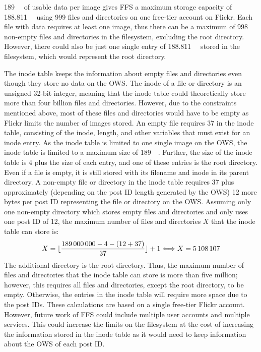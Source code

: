 \SI{189}{\mega\byte} of usable data per image gives \gls{FFS} a maximum storage capacity of \SI{188.811}{\giga\byte} using 999 files and directories on one \mbox{free-tier} account on Flickr. Each file with data requires at least one image, thus there can be a maximum of 998 \mbox{non-empty} files and directories in the filesystem, excluding the root directory. However, there could also be just one single entry of \SI{188.811}{\giga\byte} stored in the filesystem, which would represent the root directory.

The inode table keeps the information about empty files and directories even though they store no data on the \gls{OWS}. The inode of a file or directory is an unsigned \mbox{32-bit} integer, meaning that the inode table could theoretically store more than four billion files and directories. However, due to the constraints mentioned above, most of these files and directories would have to be empty as Flickr limits the number of images stored. An empty file requires \SI{37}{\byte} in the inode table, consisting of the inode, length, and other variables that must exist for an inode entry. As the inode table is limited to one single image on the \gls{OWS}, the inode table is limited to a maximum size of \SI{189}{\mega\byte}. Further, the size of the inode table is \SI{4}{\byte} plus the size of each entry, and one of these entries is the root directory. Even if a file is empty, it is still stored with its filename and inode in its parent directory. A \mbox{non-empty} file or directory in the inode table requires \SI{37}{\byte} plus approximately (depending on the post ID length generated by the \gls{OWS}) 12 more bytes per post ID representing the file or directory on the \gls{OWS}. Assuming only one \mbox{non-empty} directory which stores empty files and directories and only uses one post ID of \SI{12}{\byte}, the maximum number of files and directories $X$ that the inode table can store is:
$$
	X = \lfloor \frac{189\,000\,000 - 4 - (12 + 37)}{37} \rfloor + 1 \Longleftrightarrow X = 5\,108\,107
$$
The additional directory is the root directory. Thus, the maximum number of files and directories that the inode table can store is more than five million; however, this requires all files and directories, except the root directory, to be empty. Otherwise, the entries in the inode table will require more space due to the post IDs. These calculations are based on a single \mbox{free-tier} Flickr account. However, future work of \gls{FFS} could include multiple user accounts and multiple services. This could increase the limits on the filesystem at the cost of increasing the information stored in the inode table as it would need to keep information about the \gls{OWS} of each post ID.


